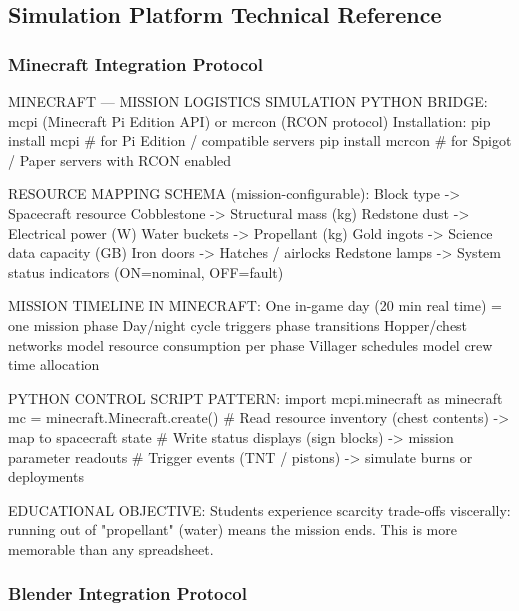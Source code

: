 \documentclass[11pt,letterpaper]{article}
\begin{document}
\subsection{Simulation Platform Technical Reference}

\subsubsection{Minecraft Integration Protocol}

\begin{simplatbox}{MINECRAFT --- MISSION LOGISTICS SIMULATION}
PYTHON BRIDGE: mcpi (Minecraft Pi Edition API) or mcrcon (RCON protocol)
Installation:
  pip install mcpi    \# for Pi Edition / compatible servers
  pip install mcrcon  \# for Spigot / Paper servers with RCON enabled

RESOURCE MAPPING SCHEMA (mission-configurable):
  Block type      -> Spacecraft resource
  Cobblestone     -> Structural mass (kg)
  Redstone dust   -> Electrical power (W)
  Water buckets   -> Propellant (kg)
  Gold ingots     -> Science data capacity (GB)
  Iron doors      -> Hatches / airlocks
  Redstone lamps  -> System status indicators (ON=nominal, OFF=fault)

MISSION TIMELINE IN MINECRAFT:
  One in-game day (20 min real time) = one mission phase
  Day/night cycle triggers phase transitions
  Hopper/chest networks model resource consumption per phase
  Villager schedules model crew time allocation

PYTHON CONTROL SCRIPT PATTERN:
  import mcpi.minecraft as minecraft
  mc = minecraft.Minecraft.create()
  \# Read resource inventory (chest contents) -> map to spacecraft state
  \# Write status displays (sign blocks) -> mission parameter readouts
  \# Trigger events (TNT / pistons) -> simulate burns or deployments

EDUCATIONAL OBJECTIVE:
  Students experience scarcity trade-offs viscerally:
  running out of "propellant" (water) means the mission ends.
  This is more memorable than any spreadsheet.
\end{simplatbox}

\subsubsection{Blender Integration Protocol}
\end{document}
